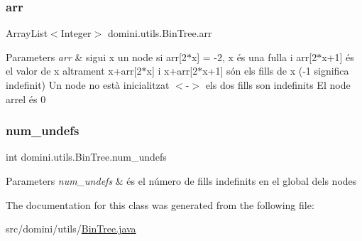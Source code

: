 \subsubsection{\texorpdfstring{arr}{arr}}
{\footnotesize\ttfamily Array\+List$<$Integer$>$ domini.\+utils.\+Bin\+Tree.\+arr\hspace{0.3cm}{\ttfamily [private]}}


\begin{DoxyParams}{Parameters}
{\em arr} & sigui x un node si arr\mbox{[}2$\ast$x\mbox{]} = -\/2, x és una fulla i arr\mbox{[}2$\ast$x+1\mbox{]} és el valor de x altrament x+arr\mbox{[}2$\ast$x\mbox{]} i x+arr\mbox{[}2$\ast$x+1\mbox{]} són els fills de x (-\/1 significa indefinit) Un node no està inicialitzat $<$-\/$>$ els dos fills son indefinits El node arrel és 0 \\
\hline
\end{DoxyParams}
\mbox{\label{classdomini_1_1utils_1_1BinTree_a36f1212262c353accbc0a0385fa45a8d}} 
\subsubsection{\texorpdfstring{num\+\_\+undefs}{num\_undefs}}
{\footnotesize\ttfamily int domini.\+utils.\+Bin\+Tree.\+num\+\_\+undefs\hspace{0.3cm}{\ttfamily [private]}}


\begin{DoxyParams}{Parameters}
{\em num\+\_\+undefs} & és el número de fills indefinits en el global dels nodes \\
\hline
\end{DoxyParams}


The documentation for this class was generated from the following file\+:\begin{DoxyCompactItemize}
\item 
src/domini/utils/\hyperlink{BinTree_8java}{Bin\+Tree.\+java}\end{DoxyCompactItemize}
